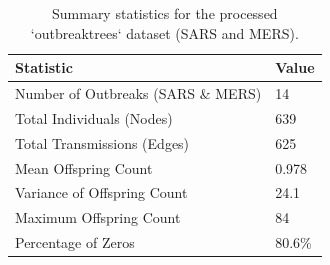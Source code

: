 \begin{table}[ht]
\centering
\caption{Summary statistics for the processed `outbreaktrees` dataset (SARS and MERS).} 
\label{tab:data_summary}
\begin{tabular}{ll}
  \hline
Statistic & Value \\ 
  \hline
Number of Outbreaks (SARS \& MERS) & 14 \\ 
  Total Individuals (Nodes) & 639 \\ 
  Total Transmissions (Edges) & 625 \\ 
  Mean Offspring Count & 0.978 \\ 
  Variance of Offspring Count & 24.1 \\ 
  Maximum Offspring Count & 84 \\ 
  Percentage of Zeros & 80.6\% \\ 
   \hline
\end{tabular}
\end{table}
